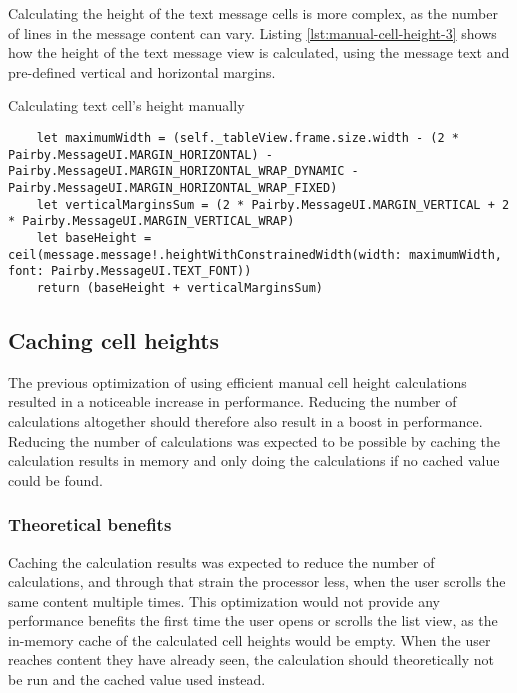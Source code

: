 \documentclass[a4paper,12pt]{article}
\begin{document}
Calculating the height of the text message cells is more complex, as the number of lines in the message content can vary. Listing \autoref{lst:manual-cell-height-3} shows how the height of the text message view is calculated, using the message text and pre-defined vertical and horizontal margins.
\begin{listing}[H]
  \caption{Calculating text cell's height manually}
  \label{lst:manual-cell-height-3}
  \begin{verbatim}
    let maximumWidth = (self._tableView.frame.size.width - (2 * Pairby.MessageUI.MARGIN_HORIZONTAL) - Pairby.MessageUI.MARGIN_HORIZONTAL_WRAP_DYNAMIC - Pairby.MessageUI.MARGIN_HORIZONTAL_WRAP_FIXED)
    let verticalMarginsSum = (2 * Pairby.MessageUI.MARGIN_VERTICAL + 2 * Pairby.MessageUI.MARGIN_VERTICAL_WRAP)
    let baseHeight = ceil(message.message!.heightWithConstrainedWidth(width: maximumWidth, font: Pairby.MessageUI.TEXT_FONT))
    return (baseHeight + verticalMarginsSum)
  \end{verbatim}
\end{listing}

\subsection{Caching cell heights}
\label{subsec:caching-cell-heights}
The previous optimization of using efficient manual cell height calculations resulted in a noticeable increase in performance. Reducing the number of calculations altogether should therefore also result in a boost in performance. Reducing the number of calculations was expected to be possible by caching the calculation results in memory and only doing the calculations if no cached value could be found.

\subsubsection{Theoretical benefits}
Caching the calculation results was expected to reduce the number of calculations, and through that strain the processor less, when the user scrolls the same content multiple times. This optimization would not provide any performance benefits the first time the user opens or scrolls the list view, as the in-memory cache of the calculated cell heights would be empty. When the user reaches content they have already seen, the calculation should theoretically not be run and the cached value used instead.
\end{document}
